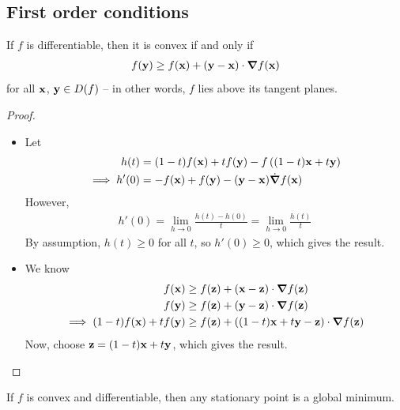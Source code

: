 \documentclass{../template/note}
\begin{document}
    \subsection{First order conditions}

    \begin{theorem}
        \label{first-order-condition}
        If $f$ is differentiable, then it is convex if and only if
        \begin{align*}
            f(\V y) \geq f(\V x) + (\V y - \V x) \cdot \grad f(\V x)
        \end{align*}
        for all $\V x$, $\V y \in D(f)$ -- in other words, $f$ lies above its tangent planes.        
    \end{theorem}

    \begin{proof}
        \begin{itemize}
            \item[$\implies$] Let
            \begin{align*}
                h(t) &= (1-t)f(\V x) + tf(\V y) - f\left((1-t)\V x + t\V y\right) \\
                \implies h'(0) &= -f(\V x) + f(\V y) - (\V y - \V x) \dot \grad f(\V x)
            \end{align*}
            However,
            \begin{align*}
                h'(0) = \lim_{h \to 0} \frac{h(t)-h(0)}{t} = \lim_{h \to 0} \frac{h(t)}{t}
            \end{align*}
            By assumption, $h(t) \geq 0$ for all $t$, so $h'(0) \geq 0$, which gives the result.
            \item[$\impliedby$] We know
            \begin{align*}
                f(\V x) &\geq f(\V z) + (\V x - \V z) \cdot \grad f(\V z) \\
                f(\V y) &\geq f(\V z) + (\V y - \V z) \cdot \grad f(\V z) \\
                \implies (1-t)f(\V x) + tf(\V y) &\geq f(\V z) + \left((1-t)\V x + t\V y - \V z\right)\cdot \grad f(\V z)
            \end{align*}
            Now, choose $\V z = (1-t)\V x + t\V y$, which gives the result.
        \end{itemize}
    \end{proof}
    
    \begin{corollary}
        If $f$ is convex and differentiable, then any stationary point is a global minimum.
    \end{corollary}
    
\end{document}

